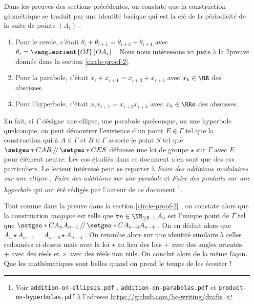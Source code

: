 Dans les preuves des sections précédentes, on constate que la construction géométrique se traduit par une identité basique qui est la clé de la périodicité de la suite de points $\left( A_i \right)$ . 
\begin{enumerate}
	\item Pour le cercle, c'était $\theta_i + \theta_{i+1} = \theta_{i+3} + \theta_{i+4}$ avec $\theta_i = \vangleorient{OI}{OA_i}$ . Nous nous intéressons ici juste à la 2\ieme preuve donnée dans la section \ref{circle-proof-2}. 

	\item Pour la parabole, c'était $x_i + x_{i+1} = x_{i+3} + x_{i+4}$ avec $x_k \in \RR$ des abscisses. 

	\item Pour l'hyperbole, c'était  $x_i x_{i+1} = x_{i+3} x_{i+4}$ avec $x_k \in \RRs$ des abscisses.
\end{enumerate}


\medskip


En fait, si $\Gamma$ désigne une ellipse, une parabole quelconque, ou une hyperbole quelconque, on peut démontrer l'existence d'un point $E \in \Gamma$ tel que la construction qui à $A \in \Gamma$ et $B \in \Gamma$ associe le point $S$ tel que $\setgeo*{C}{AB} \,/\!/\, \setgeo*{C}{ES}$ définisse une loi de groupe $\star$ sur $\Gamma$ avec $E$ pour élément neutre. 
Les cas étudiés dans ce document n'en sont que des cas particuliers. 
Le lecteur intéressé peut se reporter à  
\emph{\og Faire des additions modulaires sur une ellipse \fg} ,
\emph{\og Faire des additions sur une parabole \fg} 
et
\emph{\og Faire des produits sur une hyperbole \fg}
qui ont été rédigés par l'auteur de ce document
\footnote{
	Voir \texttt{addition-on-ellipsis.pdf} , \texttt{addition-on-parabolas.pdf}  et \texttt{product-on-hyperbolas.pdf}  à l'adresse \url{https://github.com/bc-writing/drafts} .
}.


\medskip


Tout comme dans la preuve dans la section \ref{circle-proof-2} , on constate alors que la construction \emph{\og magique \fg} est telle que $\forall n \in \NN_{\geq 5}$ , $A_{n}$ est l'unique point de $\Gamma$ tel que $\setgeo*{C}{A_{n} A_{n-1}} \,/\!/\, \setgeo*{C}{A_{n-3} A_{n-4}}$ . On en déduit alors que $A_{n} \star A_{n-1} = A_{n-3} \star A_{n-4}$ . On retombe alors sur une identité similaire à celles redonnées ci-dessus mais avec la loi $\star$ au lieu des lois $+$ avec des angles orientés, $+$ avec des réels et $\times$ avec des réels non nuls. On conclut alors de la même façon. Que les mathématiques sont belles quand on prend le temps de les écouter !
